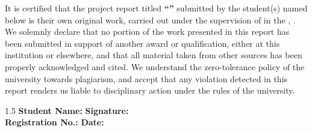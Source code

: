\thispagestyle{plain}


\vspace{0.5cm}

It is certified that the project report titled
\textbf{``\fypProjectTitle''}
submitted by the student(s) named below is their own original work,
carried out under the supervision of \fypSupervisor{} in the
\fypDepartment, \fypUniversity. We solemnly declare that no portion of
the work presented in this report has been submitted in support of
another award or qualification, either at this institution or
elsewhere, and that all material taken from other sources has been
properly acknowledged and cited. We understand the zero-tolerance
policy of the university towards plagiarism, and accept that any
violation detected in this report renders us liable to disciplinary
action under the rules of the university.

\vspace{1.4cm}

\noindent
\begin{minipage}[t]{\textwidth}
\setlength{\parindent}{0pt}
\begin{spacing}{1.5}
\textbf{Student Name:} \fypStudentOneName \hfill \textbf{Signature:} \fypsigline[5cm]\\
\textbf{Registration No.:} \fypStudentOneReg \hfill \textbf{Date:} \fypsigline[5cm]
\end{spacing}
\end{minipage}


